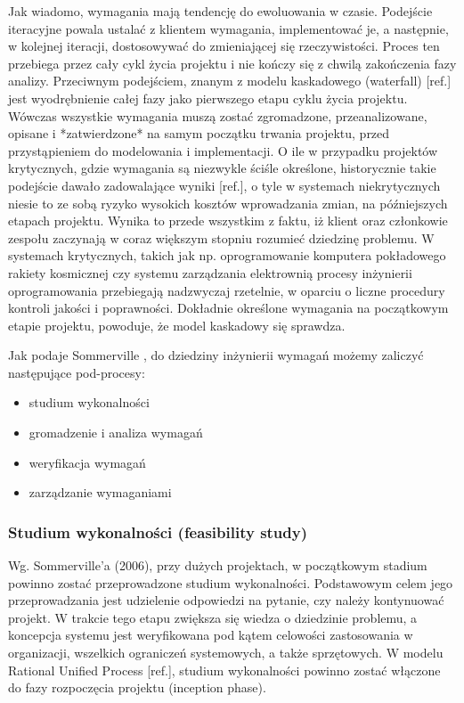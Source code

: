       Jak wiadomo, wymagania mają tendencję do ewoluowania w czasie. Podejście iteracyjne powala ustalać z klientem wymagania, implementować je, a następnie, w kolejnej iteracji, dostosowywać do zmieniającej się rzeczywistości. Proces ten przebiega przez cały cykl życia projektu i nie kończy się z chwilą zakończenia fazy analizy. Przeciwnym podejściem, znanym z modelu kaskadowego (waterfall) [ref.] jest wyodrębnienie całej fazy jako pierwszego etapu cyklu życia projektu. Wówczas wszystkie wymagania muszą zostać zgromadzone, przeanalizowane, opisane i *zatwierdzone* na samym początku trwania projektu, przed przystąpieniem do modelowania i implementacji. O ile w przypadku projektów krytycznych, gdzie wymagania są niezwykle ściśle określone, historycznie takie podejście dawało zadowalające wyniki [ref.], o tyle w systemach niekrytycznych niesie to ze sobą ryzyko wysokich kosztów wprowadzania zmian, na późniejszych etapach projektu. Wynika to przede wszystkim z faktu, iż klient oraz członkowie zespołu zaczynają w coraz większym stopniu rozumieć dziedzinę problemu. W systemach krytycznych, takich jak np. oprogramowanie komputera pokładowego rakiety kosmicznej czy systemu zarządzania elektrownią procesy inżynierii oprogramowania przebiegają nadzwyczaj rzetelnie, w oparciu o liczne procedury kontroli jakości i poprawności. Dokładnie określone wymagania na początkowym etapie projektu, powoduje, że model kaskadowy się sprawdza. \cite{NasaSE} 

      Jak podaje Sommerville \cite{Somm06}, do dziedziny inżynierii wymagań możemy zaliczyć następujące pod-procesy:

      \begin{itemize} 
          \item studium wykonalności 
          \item gromadzenie i analiza wymagań
          \item weryfikacja wymagań
          \item zarządzanie wymaganiami
      \end{itemize}

      \subsubsection{Studium wykonalności (feasibility study)}

        Wg. Sommerville'a (2006), przy dużych projektach, w początkowym stadium powinno zostać przeprowadzone studium wykonalności. Podstawowym celem jego przeprowadzania jest udzielenie odpowiedzi na pytanie, czy należy kontynuować projekt. W trakcie tego etapu zwiększa się wiedza o dziedzinie problemu, a koncepcja systemu jest weryfikowana pod kątem celowości zastosowania w organizacji, wszelkich ograniczeń systemowych, a także sprzętowych. W modelu Rational Unified Process [ref.], studium wykonalności powinno zostać włączone do fazy rozpoczęcia projektu (inception phase).

